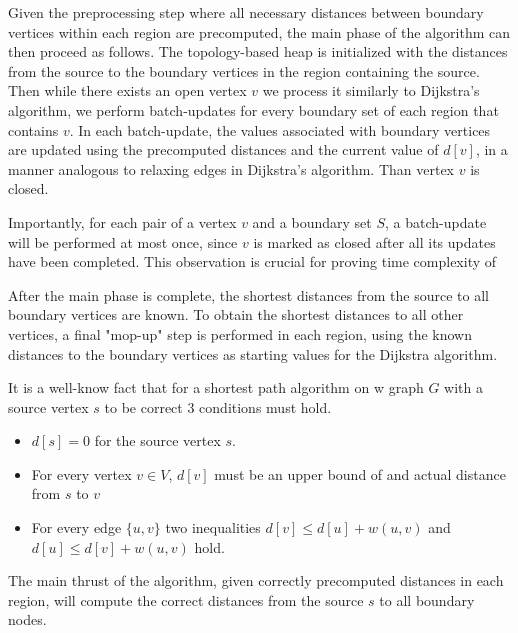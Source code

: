 Given the preprocessing step where all necessary distances between boundary vertices within each region are precomputed, the main phase of the algorithm can then proceed as follows. The topology-based heap is initialized with the distances from the source to the boundary vertices in the region containing the source. Then while there exists an open vertex $v$ we process it similarly to Dijkstra's algorithm, we perform batch-updates for every boundary set of each region that contains $v$. In each batch-update, the values associated with boundary vertices are updated using the precomputed distances and the current value of $d[v]$, in a manner analogous to relaxing edges in Dijkstra's algorithm. Than vertex $v$ is closed.

Importantly, for each pair of a vertex $v$ and a boundary set $S$, a batch-update will be performed at most once, since $v$ is marked as closed after all its updates have been completed. This observation is crucial for proving time complexity of 

After the main phase is complete, the shortest distances from the source to all boundary vertices are known. To obtain the shortest distances to all other vertices, a final "mop-up" step is performed in each region, using the known distances to the boundary vertices as starting values for the Dijkstra algorithm.

It is a well-know fact that for a shortest path algorithm on w graph $G$ with a source vertex $s$ to be correct 3 conditions must hold.
\begin{itemize}
    \item $d[s] = 0$ for the source vertex $s$.
    \item For every vertex $v \in V$, $d[v]$ must be an upper bound of and actual distance from $s$ to $v$
    \item For every edge $\{u, v\}$ two inequalities $d[v] \leq d[u] + w(u,v)$ and $d[u] \leq d[v] + w(u,v)$ hold.
\end{itemize}

\begin{lemma}
The main thrust of the algorithm, given correctly precomputed distances in each region, will compute the correct distances from the source $s$ to all boundary nodes.
\end{lemma}

